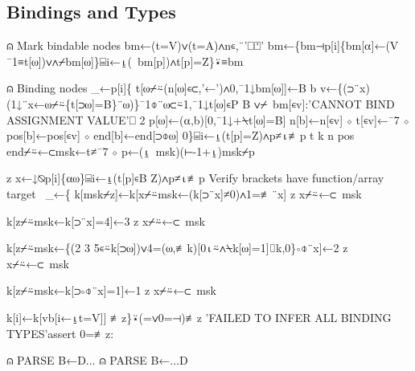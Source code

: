\documentclass{article}%
\begin{document}
\subsection{Bindings and Types}

\nwenddocs{}\endmoddef\nwstartdeflinemarkup{}\nwenddeflinemarkup
⍝ Mark bindable nodes
bm←(t=V)∨(t=A)∧n∊,¨'⎕⍞'
bm←\{bm⊣p[i]\{bm[⍺]←(V ¯1≡t[⍵])∨∧⌿bm[⍵]\}⌸i←⍸(~bm[p])∧t[p]=Z\}⍣≡bm

⍝ Binding nodes
_←p[i]\{
        t[⍵⌿⍨(n[⍵]∊⊂,'←')∧0,¯1↓bm[⍵]]←B
        b v←\{(⊃¨x)(1↓¨x←⍵⌿⍨\{t[⊃⍵]=B\}¨⍵)\}¯1⌽¨⍵⊂⍨1,¯1↓t[⍵]∊P B
        ∨⌿~bm[∊v]:'CANNOT BIND ASSIGNMENT VALUE'⎕ 2
        p[⍵]←(⍺,b)[0,¯1↓+⍀t[⍵]=B]
        n[b]←n[∊v] ⋄ t[∊v]←¯7 ⋄ pos[b]←pos[∊v] ⋄ end[b]←end[⊃⌽⍵]
0\}⌸i←⍸(t[p]=Z)∧p≠⍳≢p
t k n pos end⌿⍨←⊂msk←t≠¯7 ⋄ p←(⍸~msk)(⊢-1+⍸)msk⌿p
\nwendcode{}\nwdocspar

\nwenddocs{}\endmoddef\nwstartdeflinemarkup{}\nwenddeflinemarkup
z x←↓⍉p[i]\{⍺⍵\}⌸i←⍸(t[p]∊B Z)∧p≠⍳≢p
\LA{}Verify brackets have function/array target~{\nwtagstyle{}}\RA{}
_←\{
        k[msk⌿z]←k[x⌿⍨msk←(k[⊃¨x]≠0)∧1=≢¨x]
        z x⌿⍨←⊂~msk

        k[z⌿⍨msk←k[⊃¨x]=4]←3
        z x⌿⍨←⊂~msk

        k[z⌿⍨msk←\{(2 3 5∊⍨k[⊃⍵])∨4=(⍵,≢k)[0⍳⍨∧⍀k[⍵]=1]⌷k,0\}∘⌽¨x]←2
        z x⌿⍨←⊂~msk

        k[z⌿⍨msk←k[⊃∘⌽¨x]=1]←1
        z x⌿⍨←⊂~msk

        k[i]←k[vb[i←⍸t=V]]
≢z\}⍣(=∨0=⊣)≢z
'FAILED TO INFER ALL BINDING TYPES'assert 0=≢z:
\nwendcode{}\nwdocspar

\nwenddocs{}\endmoddef\nwstartdeflinemarkup{}\nwenddeflinemarkup
⍝ PARSE B←D...
⍝ PARSE B←...D
\nwendcode{}\nwdocspar
\end{document}
